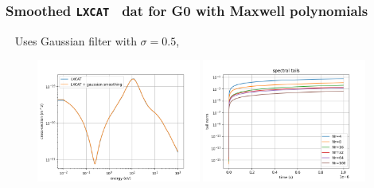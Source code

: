 \documentclass[mathserif, aspectratio=169]{beamer}
\newcommand{\lxcat}{\texttt{LXCAT}}
\begin{document}
	\begin{frame}
		\frametitle{Smoothed \lxcat~ dat for G0 with Maxwell polynomials}
		\textbullet~ Uses Gaussian filter with $\sigma=0.5$, 
		\begin{figure}
			\only<+>
			{	
				\includegraphics[width=0.48\textwidth]{g0_tcs_sigma_0.5.png}
				\includegraphics[width=0.48\textwidth]{g0_mw_smoothed_tails.png}
			}


\end{figure}
\end{frame}
\end{document}
